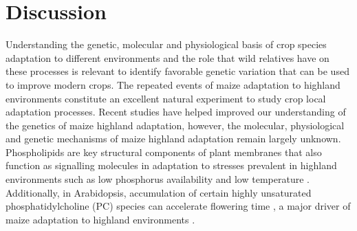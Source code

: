 \documentclass[9pt,twocolumn,twoside,lineno]{BioRxiv}
\begin{document}
 \section{Discussion}
\label{sec:discussion}
Understanding the genetic, molecular and  physiological basis of crop species adaptation to different environments and the role that wild relatives have on these processes is relevant to identify favorable genetic variation that can be used to improve modern crops.
The repeated events of maize adaptation to highland environments constitute an excellent natural experiment to study crop local adaptation processes. 
Recent studies \cite{Wang2020-mp, Takuno2015-uj, Crow2020-gene} have helped improved our understanding of the genetics of maize highland adaptation, however, the molecular, physiological and genetic mechanisms of maize highland adaptation remain largely unknown.
Phospholipids are key structural components of plant membranes that also function as signalling molecules in adaptation to stresses prevalent in highland environments \cite{Ryu2004-iv, Nakamura2017-vb} such as low phosphorus availability \cite{Veneklaas2012-ls, Cruz-Ramirez2004-ib, Lambers2012-an} and low temperature \cite{Degenkolbe2012-wf, Welti2002-uk, Marla2017-ph}. 
Additionally, in Arabidopsis, accumulation of certain highly unsaturated phosphatidylcholine (PC) species can accelerate flowering time \cite{Nakamura2014-qf}, a major driver of maize adaptation to highland environments \cite{Romero_Navarro2017-cn, Gates2019-xu}.
 
\end{document}
